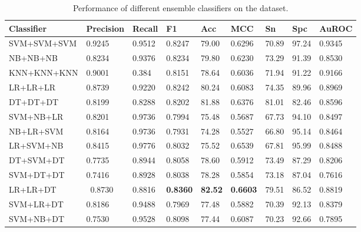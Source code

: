 \begin{table}[h]
\centering
\begin{tabular}{l|p{1.5cm}p{1.2cm}p{1cm}p{1cm}p{1cm}p{1cm}p{1cm}p{1cm}} \hline
\bf Classifier & \bf Precision & \bf Recall & \bf F1 & \bf Acc& \bf MCC & \bf Sn& \bf Spc& %
\bf AuROC \\\hline
SVM+SVM+SVM & 0.9245 & 0.9512 & 0.8247 & 79.00& 0.6296 & 70.89& 97.24& %
0.9345   \\\hline
NB+NB+NB & 0.8234 & 0.9376 & 0.8234 & 79.80& 0.6230 & 73.29& 91.39 & %
0.8530   \\\hline
KNN+KNN+KNN & 0.9001 & 0.384 & 0.8151 & 78.64& 0.6036 & 71.94& 91.22& %
0.9166 \\\hline
LR+LR+LR & 0.8739 & 0.9220 & 0.8242 & 80.24 & 0.6083 & 74.35 & 89.96& %
0.8969  \\\hline
DT+DT+DT & 0.8199 & 0.8288 & 0.8202 & 81.88& 0.6376 & 81.01 & 82.46 & %
0.8596  \\\hline
SVM+NB+LR & 0.8201 & 0.9736	& 0.7994 & 75.48& 0.5687 & 67.73 & 94.10 & %
0.8497 \\\hline
NB+LR+SVM & 0.8164 & 0.9736 & 0.7931 & 74.28& 0.5527 & 66.80 & 95.14 & %
0.8464 \\\hline
LR+SVM+NB & 0.8415 & 0.9776 & 0.8032 & 75.52 & 0.6539 & 67.81 & 95.99& %
0.8488 \\\hline
DT+SVM+DT & 0.7735 & 0.8944 & 0.8058 & 78.60 & 0.5912 & 73.49& 87.29 & %
0.8206 \\\hline
SVM+DT+DT & 0.7416 & 0.8928 & 0.8038 & 78.28 & 0.5854 & 73.18 & 87.04 & %
0.7616 \\\hline
LR+LR+DT &\ 0.8730 & 0.8816 &\bf  0.8360 & \bf 82.52&\bf  0.6603 & 79.51 & 86.52& %
0.8819 \\\hline
SVM+LR+DT & 0.8186 & 0.9488 & 0.7969 & 77.48& 0.5882 & 70.39 & 92.13& %
0.8379 \\\hline
SVM+NB+DT & 0.7530 & 0.9528 & 0.8098 & 77.44& 0.6087 & 70.23 & 92.66& %
0.7895 \\\hline
\end{tabular}
\caption{Performance of different ensemble classifiers on the dataset. \label{tabEnsemble}}
\end{table}

